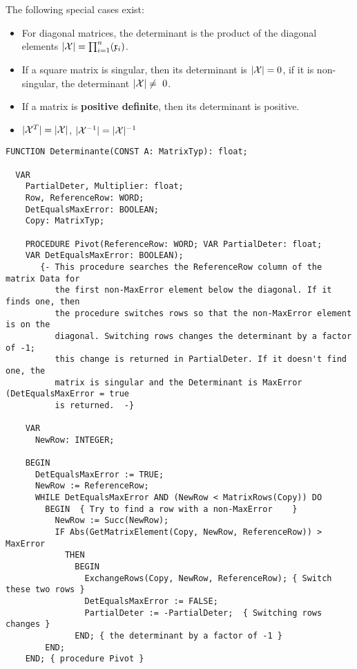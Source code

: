 \begin{refsection}
The following special cases exist:
\begin{itemize}
  \item{For diagonal matrices, the determinant is the product of the diagonal elements \(|\mathcal{X}| = \prod_{i=1}^{n}(\mathfrak{x}_i) \). }
  \item{If a square matrix is singular, then its determinant is \( |\mathcal{X}| = 0 \), if it is non-singular, the determinant \( |\arr{X}| \neq\ 0 \).}
  \item{If a matrix is \textbf{positive definite}, then its determinant is positive.}
  \item{\( |\mathcal{X}^T| = |\mathcal{X}| \), \(|\mathcal{X}^{-1}| = |\mathcal{X}|^{-1} \)}
\end{itemize}

\begin{lstlisting}[caption=Determinant of a matrix]
  FUNCTION Determinante(CONST A: MatrixTyp): float;

  VAR
    PartialDeter, Multiplier: float;
    Row, ReferenceRow: WORD;
    DetEqualsMaxError: BOOLEAN;
    Copy: MatrixTyp;

    PROCEDURE Pivot(ReferenceRow: WORD; VAR PartialDeter: float;
    VAR DetEqualsMaxError: BOOLEAN);
       {- This procedure searches the ReferenceRow column of the matrix Data for
          the first non-MaxError element below the diagonal. If it finds one, then
          the procedure switches rows so that the non-MaxError element is on the
          diagonal. Switching rows changes the determinant by a factor of -1;
          this change is returned in PartialDeter. If it doesn't find one, the
          matrix is singular and the Determinant is MaxError (DetEqualsMaxError = true
          is returned.  -}

    VAR
      NewRow: INTEGER;

    BEGIN
      DetEqualsMaxError := TRUE;
      NewRow := ReferenceRow;
      WHILE DetEqualsMaxError AND (NewRow < MatrixRows(Copy)) DO
        BEGIN  { Try to find a row with a non-MaxError    }
          NewRow := Succ(NewRow);
          IF Abs(GetMatrixElement(Copy, NewRow, ReferenceRow)) > MaxError
            THEN
              BEGIN
                ExchangeRows(Copy, NewRow, ReferenceRow); { Switch these two rows }
                DetEqualsMaxError := FALSE;
                PartialDeter := -PartialDeter;  { Switching rows changes }
              END; { the determinant by a factor of -1 }
        END;
    END; { procedure Pivot }


\end{lstlisting}
\end{refsection}
